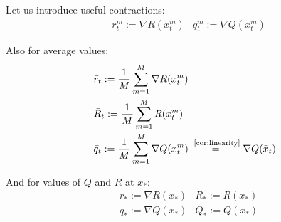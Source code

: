 $ $\par
Let us introduce useful contractions:
\begin{align}
    &r^m_t := \nabla R(x^m_t)
    &q^m_t := \nabla Q(x^m_t)
\end{align}

Also for average values:
\begin{align}
    &\bar{r}_t := \fsumm {m=1}{M}{\nabla R(x^m_t)} \\
    &\bar{R}_t := \fsumm {m=1}{M}{R(x^m_t)} \\
    &\bar{q}_t := \fsumm {m=1}{M}{\nabla Q(x^m_t)} \overset{\text{~\ref{cor:linearity}}}{=}  \nabla Q(\bar{x}_t)
\end{align}

And for values of $Q$ and $R$ at $x_*$:
\begin{align}
    &r_* := \nabla R(x_*)
    &R_* := R(x_*) \\
    &q_* := \nabla Q(x_*)
    &Q_* := Q(x_*)
\end{align}